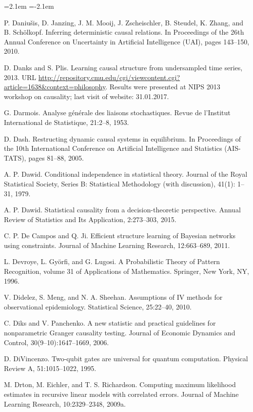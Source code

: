 \begin{list}{}{\leftmargin=2.1em
 \itemindent=-2.1em\parsep=0pt\itemsep=3pt}
\item P. Daniušis, D. Janzing, J. M. Mooij, J. Zscheischler, B. Steudel, K. Zhang, and B. Schölkopf. Inferring deterministic causal relations. In Proceedings of the 26th Annual Conference on Uncertainty in Artificial Intelligence (UAI), pages 143--150, 2010.
\item D. Danks and S. Plis. Learning causal structure from undersampled time series, 2013. URL \url{http://repository.cmu.edu/cgi/viewcontent.cgi?article=1638&context=philosophy}. Results were presented at NIPS 2013 workshop on causality; last visit of website: 31.01.2017.
\item G. Darmois. Analyse générale des liaisons stochastiques. Revue de l'Institut International de Statistique, 21:2--8, 1953.
\item D. Dash. Restructing dynamic causal systems in equilibrium. In Proceedings of the 10th International Conference on Artificial Intelligence and Statistics (AIS-TATS), pages 81--88, 2005.
\item A. P. Dawid. Conditional independence in statistical theory. Journal of the Royal Statistical Society, Series B: Statistical Methodology (with discussion), 41(1): 1--31, 1979.
\item A. P. Dawid. Statistical causality from a decision-theoretic perspective. Annual Review of Statistics and Its Application, 2:273--303, 2015.
\item C. P. De Campos and Q. Ji. Efficient structure learning of Bayesian networks using constraints. Journal of Machine Learning Research, 12:663--689, 2011.
\item L. Devroye, L. Györfi, and G. Lugosi. A Probabilistic Theory of Pattern Recognition, volume 31 of Applications of Mathematics. Springer, New York, NY, 1996.
\item V. Didelez, S. Meng, and N. A. Sheehan. Assumptions of IV methods for observational epidemiology. Statistical Science, 25:22--40, 2010.
\item C. Diks and V. Panchenko. A new statistic and practical guidelines for nonparametric Granger causality testing. Journal of Economic Dynamics and Control, 30(9--10):1647--1669, 2006.
\item D. DiVincenzo. Two-qubit gates are universal for quantum computation. Physical Review A, 51:1015--1022, 1995.
\item M. Drton, M. Eichler, and T. S. Richardson. Computing maximum likelihood estimates in recursive linear models with correlated errors. Journal of Machine Learning Research, 10:2329--2348, 2009a.

\end{list}
